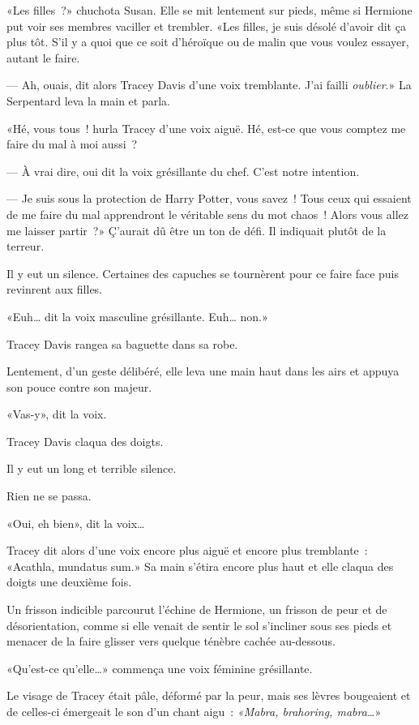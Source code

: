 «Les filles~?» chuchota Susan. Elle se mit lentement sur pieds, même si Hermione put voir ses membres vaciller et trembler. «Les filles, je suis désolé d'avoir dit ça plus tôt. S'il y a quoi que ce soit d'héroïque ou de malin que vous voulez essayer, autant le faire.

--- Ah, ouais, dit alors Tracey Davis d'une voix tremblante. J'ai failli \emph{oublier}.» La Serpentard leva la main et parla.

«Hé, vous tous~! hurla Tracey d'une voix aiguë. Hé, est-ce que vous comptez me faire du mal à moi aussi~?

--- À vrai dire, oui dit la voix grésillante du chef. C'est notre intention.

--- Je suis sous la protection de Harry Potter, vous savez~! Tous ceux qui essaient de me faire du mal apprendront le véritable sens du mot chaos~! Alors vous allez me laisser partir~?» Ç'aurait dû être un ton de défi. Il indiquait plutôt de la terreur.

Il y eut un silence. Certaines des capuches se tournèrent pour ce faire face puis revinrent aux filles.

«Euh… dit la voix masculine grésillante. Euh… non.»

Tracey Davis rangea sa baguette dans sa robe.

Lentement, d'un geste délibéré, elle leva une main haut dans les airs et appuya son pouce contre son majeur.

«Vas-y», dit la voix.

Tracey Davis claqua des doigts.

Il y eut un long et terrible silence.

Rien ne se passa.

«Oui, eh bien», dit la voix…

Tracey dit alors d'une voix encore plus aiguë et encore plus tremblante~: «Acathla, mundatus sum.» Sa main s'étira encore plus haut et elle claqua des doigts une deuxième fois.

Un frisson indicible parcourut l'échine de Hermione, un frisson de peur et de désorientation, comme si elle venait de sentir le sol s'incliner sous ses pieds et menacer de la faire glisser vers quelque ténèbre cachée au-dessous.

«Qu'est-ce qu'elle…» commença une voix féminine grésillante.

Le visage de Tracey était pâle, déformé par la peur, mais ses lèvres bougeaient et de celles-ci émergeait le son d'un chant aigu~: \emph{«Mabra, brahoring, mabra…}»

